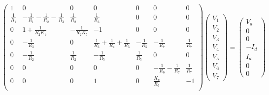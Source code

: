     \begin{equation}
\left(\begin{array}{ccccccc} 
1 & 0 & 0 & 0 & 0 & 0 & 0\\
\frac{1}{R_1} & -\frac{1}{R_1}-\frac{1}{R_2} -\frac{1}{R_3} & \frac{1}{R_2} & \frac{1}{R_3}& 0 & 0 & 0 \\
0 & 1+\frac{1}{R_2 K_b} & -\frac{1}{R_2 K_b} & -1 & 0 & 0 & 0 \\
0 & -\frac{1}{R_3} & 0 & \frac{1}{R_3} +\frac{1}{R_4}+\frac{1}{R_5} & -\frac{1}{R_5} & -\frac{1}{R_7} & \frac{1}{R_7} \\
0 & -\frac{1}{R_2} & \frac{1}{R_2} & -\frac{1}{R_5} & \frac{1}{R_5} & 0 & 0 \\
0 & 0 & 0 & 0 & 0 & -\frac{1}{R_6}-\frac{1}{R_7} & \frac{1}{R_7} \\
0 & 0 & 0 & 1 & 0 & \frac{K_c}{R_6} & -1 \\
\end{array}\right)
\left(\begin{array}{c} V_1 \\ V_2 \\ V_3 \\ V_4 \\ V_5 \\ V_6 \\ V_7 \end{array}\right) 
= \left(\begin{array}{c} V_a \\ 0 \\ 0 \\-I_d \\I_d \\ 0 \\0 \end{array}\right)
\end{equation}
